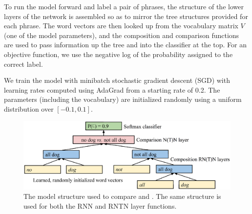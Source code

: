 To run the model forward and label a pair of phrases, the structure of the lower layers of the network is assembled so as to mirror the tree structures provided for each phrase. The word vectors are then looked up from the vocabulary matrix $V$ (one of the model parameters), and the composition and comparison functions are used to pass information up the tree and into the classifier at the top. For an objective function, we use the negative log of the probability assigned to the correct label.

We train the model with minibatch stochastic gradient descent (SGD) with learning rates computed using AdaGrad \cite{duchi2011adaptive} from a starting rate of 0.2. The parameters (including the vocabulary) are initialized randomly using a uniform distribution over $[-0.1, 0.1]$. %

\begin{figure}
\begin{center}
\includegraphics[scale=0.35]{model.eps}
\end{center}
\caption{The model structure used to compare  and . The same structure is used for both the RNN and RNTN layer functions. \label{sample-figure}} 
\end{figure}

